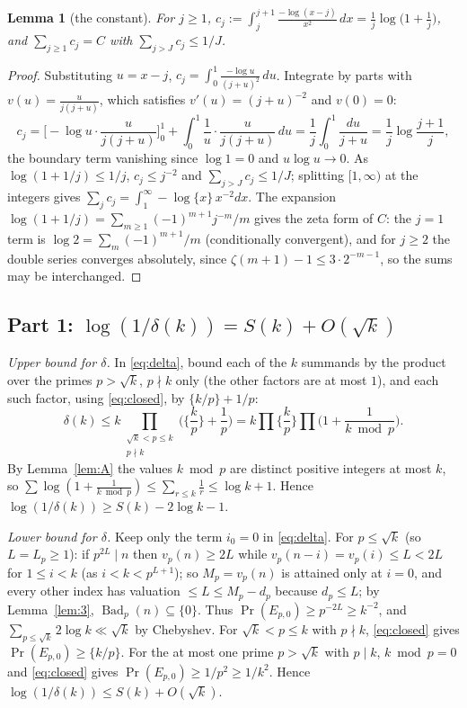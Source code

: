 \documentclass[11pt]{amsart}
\newtheorem{lemma}[theorem]{Lemma}
\theoremstyle{remark}
\DeclareMathOperator{\Bad}{Bad}
\renewcommand{\Pr}{\operatorname{Pr}}
\begin{document}
\begin{lemma}[the constant]\label{lem:B}
For $j\ge1$, $c_j:=\int_j^{j+1}\frac{-\log(x-j)}{x^2}\,dx=\frac1j\log\big(1+\frac1j\big)$, and $\sum_{j\ge1}c_j=C$ with $\sum_{j>J}c_j\le1/J$.
\end{lemma}
\begin{proof}
Substituting $u=x-j$, $c_j=\int_0^1\frac{-\log u}{(j+u)^2}\,du$. Integrate by parts with $v(u)=\frac{u}{j(j+u)}$, which satisfies $v'(u)=(j+u)^{-2}$ and $v(0)=0$:
\[c_j=\Big[-\log u\cdot\frac{u}{j(j+u)}\Big]_0^1+\int_0^1\frac1u\cdot\frac{u}{j(j+u)}\,du=\frac1j\int_0^1\frac{du}{j+u}=\frac1j\log\frac{j+1}{j},\]
the boundary term vanishing since $\log1=0$ and $u\log u\to0$. As $\log(1+1/j)\le1/j$, $c_j\le j^{-2}$ and $\sum_{j>J}c_j\le1/J$; splitting $[1,\infty)$ at the integers gives $\sum_jc_j=\int_1^\infty-\log\{x\}\,x^{-2}dx$. The expansion $\log(1+1/j)=\sum_{m\ge1}(-1)^{m+1}j^{-m}/m$ gives the zeta form of $C$: the $j=1$ term is $\log2=\sum_m(-1)^{m+1}/m$ (conditionally convergent), and for $j\ge2$ the double series converges absolutely, since $\zeta(m+1)-1\le3\cdot2^{-m-1}$, so the sums may be interchanged.
\end{proof}

\subsection*{Part 1: \texorpdfstring{$\log(1/\delta(k))=S(k)+O(\sqrt k)$}{log(1/delta) = S(k) + O(sqrt k)}}

\emph{Upper bound for $\delta$.} In \eqref{eq:delta}, bound each of the $k$ summands by the product over the primes $p>\sqrt k$, $p\nmid k$ only (the other factors are at most $1$), and each such factor, using \eqref{eq:closed}, by $\{k/p\}+1/p$:
\[\delta(k)\le k\prod_{\substack{\sqrt k<p\le k\\p\nmid k}}\Big(\Big\{\frac kp\Big\}+\frac1p\Big)=k\prod\Big\{\frac kp\Big\}\prod\Big(1+\frac1{k\bmod p}\Big).\]
By Lemma~\ref{lem:A} the values $k\bmod p$ are distinct positive integers at most $k$, so $\sum\log(1+\frac1{k\bmod p})\le\sum_{r\le k}\frac1r\le\log k+1$. Hence $\log(1/\delta(k))\ge S(k)-2\log k-1$.

\emph{Lower bound for $\delta$.} Keep only the term $i_0=0$ in \eqref{eq:delta}. For $p\le\sqrt k$ (so $L=L_p\ge1$): if $p^{2L}\mid n$ then $v_p(n)\ge2L$ while $v_p(n-i)=v_p(i)\le L<2L$ for $1\le i<k$ (as $i<k<p^{L+1}$); so $M_p=v_p(n)$ is attained only at $i=0$, and every other index has valuation $\le L\le M_p-d_p$ because $d_p\le L$; by Lemma~\ref{lem:3}, $\Bad_p(n)\subseteq\{0\}$. Thus $\Pr(E_{p,0})\ge p^{-2L}\ge k^{-2}$, and $\sum_{p\le\sqrt k}2\log k\ll\sqrt k$ by Chebyshev. For $\sqrt k<p\le k$ with $p\nmid k$, \eqref{eq:closed} gives $\Pr(E_{p,0})\ge\{k/p\}$. For the at most one prime $p>\sqrt k$ with $p\mid k$, $k\bmod p=0$ and \eqref{eq:closed} gives $\Pr(E_{p,0})\ge1/p^2\ge1/k^2$. Hence $\log(1/\delta(k))\le S(k)+O(\sqrt k)$.
\end{document}
